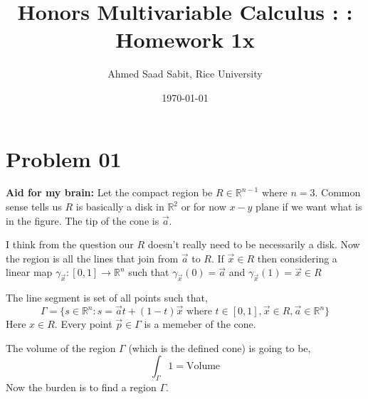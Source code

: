 \documentclass[letter]{article}
\title{Honors Multivariable Calculus : : Homework 1x}
\author{Ahmed Saad Sabit, Rice University}
\date{\today}
\begin{document}
\maketitle

\section*{Problem 01} 
\begin{tcolorbox}[colback=white, colframe=NordBlue, sharpish corners]
	\textbf{Aid for my brain: }
	Let the compact region be $R \in \mathbb{R}^{n-1}$ where $n = 3$. Common sense tells us $R$ is basically a disk in $\mathbb{R}^{2}$ or for now $x-y$ plane if we want what is in the figure. The tip of the cone is $\vec{a}$. 

	I think from the question our $R$ doesn't really need to be necessarily a disk. Now the region is all the lines that join from $\vec{a}$ to $R$. If $\vec{x} \in R$ then considering a linear map $\gamma_{\vec{x}}: [0,1] \to \mathbb{R}^{n} $ such that $\gamma_{\vec{x}}(0) = \vec{a}$ and $\gamma_{\vec{x}}(1) = \vec{x} \in R$ 

\begin{center}
\newcommand{\radiusx}{2}
\newcommand{\radiusy}{.5}
\newcommand{\height}{3}

\end{center} 
The line segment is set of all points such that, 
\[
	\Gamma = \{s \in \mathbb{R}^{n} : s = \vec{a} t + (1- t ) \vec{x} \text{ where } t \in  [0, 1], \vec{x} \in R, \vec{a} \in \mathbb{R}^{n}\} 
\]
Here $x \in  R$. Every point $\vec{p} \in \Gamma$ is a memeber of the cone.  
\end{tcolorbox}

The volume of the region $\Gamma$ (which is the defined cone) is going to be,
\[
\int_\Gamma 1 = \text{Volume}
\] 
Now the burden is to find a region $\Gamma$. 
\end{document}
